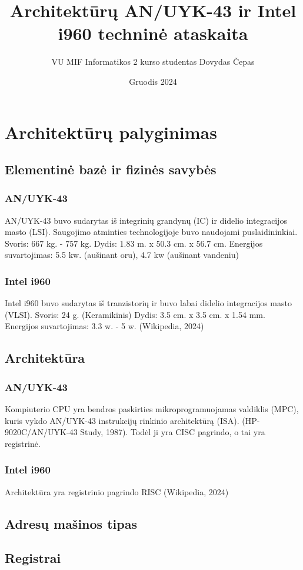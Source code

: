 \documentclass{article}
\title{Architektūrų AN/UYK-43 ir Intel i960 techninė ataskaita}
\author{VU MIF Informatikos 2 kurso studentas Dovydas Čepas}
\date{Gruodis 2024}
\begin{document}
\maketitle
\newpage
\section{Architektūrų palyginimas}
\subsection{Elementinė bazė ir fizinės savybės}
\subsubsection{AN/UYK-43}
AN/UYK-43 buvo sudarytas iš integrinių grandynų (IC) ir didelio integracijos masto (LSI). Saugojimo atminties technologijoje buvo naudojami puslaidininkiai. Svoris: 667 kg. - 757 kg. Dydis: 1.83 m. x 50.3 cm. x 56.7 cm. Energijos suvartojimas: 5.5 kw. (aušinant oru), 4.7 kw (aušinant vandeniu)
\subsubsection{Intel i960}
Intel i960 buvo sudarytas iš tranzistorių ir buvo labai didelio integracijos masto (VLSI). Svoris: 24 g. (Keramikinis) Dydis: 3.5 cm. x 3.5 cm. x 1.54 mm. Energijos suvartojimas: 3.3 w. - 5 w. (Wikipedia, 2024)
\subsection{Architektūra}
\subsubsection{AN/UYK-43}
Kompiuterio CPU yra bendros paskirties mikroprogramuojamas valdiklis (MPC), kuris vykdo AN/UYK-43 instrukcijų rinkinio architektūrą (ISA). (HP-9020C/AN/UYK-43 Study, 1987). Todėl ji yra CISC pagrindo, o tai yra registrinė.
\subsubsection{Intel i960}
Architektūra yra registrinio pagrindo RISC (Wikipedia, 2024)
\subsection{Adresų mašinos tipas}
\subsection{Registrai}
\end{document}
